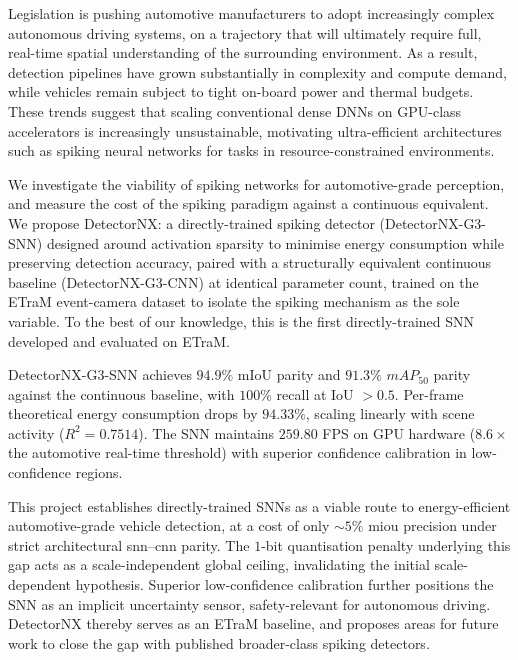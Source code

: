 Legislation is pushing automotive manufacturers to adopt increasingly complex autonomous driving systems,
on a trajectory that will ultimately require full, real-time spatial understanding of the surrounding environment.
As a result, detection pipelines have grown substantially in complexity and compute demand,
while vehicles remain subject to tight on-board power and thermal budgets.
These trends suggest that scaling conventional dense DNNs on GPU-class accelerators is increasingly unsustainable,
motivating ultra-efficient architectures such as spiking neural networks for tasks in resource-constrained environments.

We investigate the viability of spiking networks for automotive-grade perception, and measure the cost of the spiking paradigm against a continuous equivalent.
We propose DetectorNX: a directly-trained spiking detector (DetectorNX-G3-SNN) designed around activation sparsity to minimise energy consumption while preserving detection accuracy, 
paired with a structurally equivalent continuous baseline (DetectorNX-G3-CNN) at identical parameter count,
trained on the ETraM event-camera dataset to isolate the spiking mechanism as the sole variable.
To the best of our knowledge, this is the first directly-trained SNN developed and evaluated on ETraM.

DetectorNX-G3-SNN achieves $94.9\%$ mIoU parity and $91.3\%$ $mAP_{50}$ parity against the continuous baseline,
with $100\%$ recall at IoU $> 0.5$.
Per-frame theoretical energy consumption drops by $94.33\%$, scaling linearly with scene activity ($R^2 = 0.7514$).
The SNN maintains $259.80$ FPS on GPU hardware ($8.6\times$ the automotive real-time threshold) with superior confidence calibration in low-confidence regions.

This project establishes directly-trained SNNs as a viable route to energy-efficient automotive-grade vehicle detection, at a cost of only $\sim5\%$ \gls{miou} precision under strict architectural \gls{snn}--\gls{cnn} parity. 
The $1$-bit quantisation penalty underlying this gap acts as a scale-independent global ceiling, invalidating the initial scale-dependent hypothesis. 
Superior low-confidence calibration further positions the SNN as an implicit uncertainty sensor, safety-relevant for autonomous driving. 
DetectorNX thereby serves as an ETraM baseline, and proposes areas for future work to close the gap with published broader-class spiking detectors.